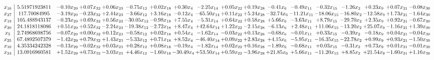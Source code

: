 \documentclass[9pt]{article}
\begin{document}
 \[\begin{array}{c| c c@{\hskip 2pt} c@{\hskip 2pt} c@{\hskip 2pt} c@{\hskip 2pt} c@{\hskip 2pt} c@{\hskip 2pt} c@{\hskip 2pt} c@{\hskip 2pt} c@{\hskip 2pt} c@{\hskip 2pt} c@{\hskip 2pt} c@{\hskip 2pt} c@{\hskip 2pt} c@{\hskip 2pt} c@{\hskip 2pt} c@{\hskip 2pt} }
 x_{16}   &  5.51971923811 & -0.10 x_{29} & +  0.07 x_{32} & +  0.06 x_{23} & -0.75 x_{12} & +  0.02 x_{18} & +  0.30 x_{4} & -2.25 x_{14} & +  0.05 x_{22} & +  0.19 x_{28} & -0.41 x_{6} & -0.49 x_{11} & -0.32 x_{15} & -1.26 x_{2} & +  0.23 x_{9} & +  0.07 x_{21} & -0.08 x_{30}\\
 x_{27}   &  117.70084995 & -3.19 x_{29} & -0.23 x_{32} & +  2.44 x_{23} & -3.66 x_{12} & +  3.16 x_{18} & -0.12 x_{4} & -65.50 x_{14} & +  0.11 x_{22} & +  5.24 x_{28} & -32.74 x_{6} & -11.21 x_{11} & -18.06 x_{15} & -16.80 x_{2} & -12.58 x_{9} & +  1.73 x_{21} & -1.64 x_{30}\\
 x_{19}   &  105.488943137 & -0.23 x_{29} & +  0.69 x_{32} & +  0.56 x_{23} & -30.05 x_{12} & -0.98 x_{18} & +  7.55 x_{4} & -5.31 x_{14} & +  0.64 x_{22} & +  0.58 x_{28} & +  5.66 x_{6} & -3.63 x_{11} & +  8.79 x_{15} & -29.70 x_{2} & +  2.35 x_{9} & +  0.92 x_{21} & -0.67 x_{30}\\
 x_{20}   &  24.1818118086 & +  0.51 x_{29} & +  0.52 x_{32} & -2.24 x_{23} & -19.38 x_{12} & -2.72 x_{18} & +  8.47 x_{4} & + 42.64 x_{14} & +  1.22 x_{22} & -2.15 x_{28} & -6.13 x_{6} & +  2.48 x_{11} & + 11.06 x_{15} & -13.20 x_{2} & + 25.07 x_{9} & -1.16 x_{21} & +  1.39 x_{30}\\
 x_{5}   &  2.74968698756 & -0.07 x_{29} & +  0.00 x_{32} & +  0.12 x_{23} & -0.58 x_{12} & +  0.02 x_{18} & +  0.54 x_{4} & -1.62 x_{14} & -0.03 x_{22} & +  0.13 x_{28} & -0.68 x_{6} & -0.01 x_{11} & +  0.33 x_{15} & -0.39 x_{2} & -0.18 x_{9} & +  0.04 x_{21} & -0.04 x_{30}\\
 x_{25}   &  67.4892507379 & -1.42 x_{29} & +  0.79 x_{32} & +  1.43 x_{23} & -5.33 x_{12} & +  0.71 x_{18} & +  8.52 x_{4} & -46.40 x_{14} & +  0.09 x_{22} & +  2.83 x_{28} & +  4.15 x_{6} & -5.95 x_{11} & -16.35 x_{15} & -22.78 x_{2} & +  0.99 x_{9} & +  0.93 x_{21} & -1.50 x_{30}\\
 x_{10}   &  4.35334242328 & -0.13 x_{29} & -0.02 x_{32} & +  0.03 x_{23} & +  0.28 x_{12} & +  0.08 x_{18} & -0.19 x_{4} & -1.82 x_{14} & +  0.02 x_{22} & +  0.16 x_{28} & -1.89 x_{6} & -0.68 x_{11} & +  0.03 x_{15} & -0.31 x_{2} & +  0.73 x_{9} & +  0.01 x_{21} & -0.01 x_{30}\\
 x_{24}   &  13.0916960581 & +  1.52 x_{29} & +  0.73 x_{32} & -3.03 x_{23} & +  4.46 x_{12} & -1.60 x_{18} & -30.49 x_{4} & + 53.50 x_{14} & +  0.59 x_{22} & -3.96 x_{28} & + 21.85 x_{6} & +  5.66 x_{11} & -11.20 x_{15} & +  8.85 x_{2} & + 21.54 x_{9} & -1.60 x_{21} & +  1.16 x_{30}\\

\end{array}\]
\end{document}
